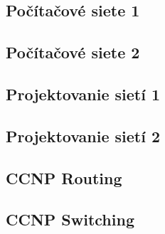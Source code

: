 \subsection{Počítačové siete 1}

\subsection{Počítačové siete 2}

\subsection{Projektovanie sietí 1}

\subsection{Projektovanie sietí 2}

\subsection{CCNP Routing}

\subsection{CCNP Switching}